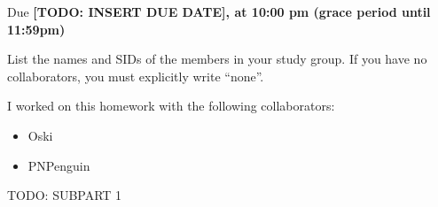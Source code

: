 \documentclass[11pt]{article}
\def\duedate{[TODO: INSERT DUE DATE], at 10:00 pm (grace period until 11:59pm)}
\begin{document}
\maketitle
Due \textbf{\duedate}


List the names and SIDs of the members in your study group.
If you have no collaborators, you must explicitly write ``none''.

\begin{solution} I worked on this homework with the following collaborators:
\begin{itemize}
    \item Oski
    \item PNPenguin
\end{itemize}
\end{solution}


\begin{subparts}
    \item TODO: SUBPART 1
\end{subparts}
\end{document}

